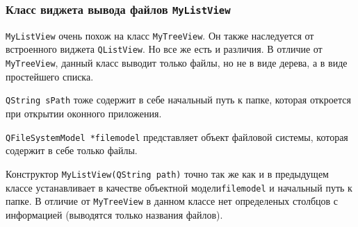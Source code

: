 \subsubsection{Класс виджета вывода файлов \texttt{MyListView}}

\texttt{MyListView} очень похож на класс \texttt{MyTreeView}.
Он также наследуется от встроенного виджета \texttt{QListView}\cite{qt_doc}.
Но все же есть и различия.
В отличие от \texttt{MyTreeView}, данный класс выводит только файлы, но не в виде дерева, а в виде простейшего списка.



\texttt{QString sPath} тоже содержит в себе начальный путь к папке, которая откроется при открытии оконного приложения.



\texttt{QFileSystemModel *filemodel} представляет объект файловой системы, которая содержит в себе только файлы.



Конструктор \texttt{MyListView(QString path)} точно так же как и в предыдущем классе устанавливает в качестве объектной модели\cite{qt_doc}\texttt{filemodel} и начальный путь к папке.
В отличие от \texttt{MyTreeView} в данном классе нет определеных столбцов с информацией (выводятся только названия файлов).
